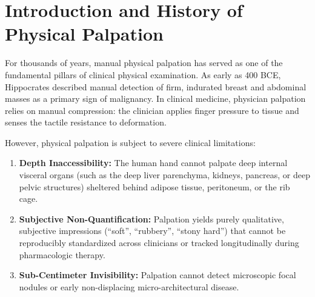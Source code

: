 \documentclass[11pt,a4paper]{article}
\begin{document}
\begin{abstract}
We examine continuum viscoelastic rheology models (Kelvin-Voigt, Maxwell, and fractional power-law dispersion), shear wave dispersion (SWD) imaging, and cerebral MRE for neurodegenerative diseases and brain tumor consistency. Finally, we elucidate high-impact clinical applications: non-invasive chronic liver disease staging across METAVIR fibrosis categories (F0 to F4 cirrhosis), Baveno VII criteria for clinically significant portal hypertension (CSPH) and esophageal varices screening, spleen stiffness measurement (SSM), characterization of breast carcinoma via the ``stiff rim sign'', thyroid nodule risk stratification, renal allograft fibrosis, musculoskeletal tendinopathy, and cardiac diastolic myocardial stiffness. We rigorously formulate quality assurance metrics, patient preparation rules (fasting state, respiratory suspension), and confounding artifacts (acute inflammation, cholestasis, cardiac congestion, and ascites).
\end{abstract}

\tableofcontents
\newpage

\section{Introduction and History of Physical Palpation}
For thousands of years, manual physical palpation has served as one of the fundamental pillars of clinical physical examination. As early as 400 BCE, Hippocrates described manual detection of firm, indurated breast and abdominal masses as a primary sign of malignancy. In clinical medicine, physician palpation relies on manual compression: the clinician applies finger pressure to tissue and senses the tactile resistance to deformation.

However, physical palpation is subject to severe clinical limitations:
\begin{enumerate}[leftmargin=2em]
    \item \textbf{Depth Inaccessibility:} The human hand cannot palpate deep internal visceral organs (such as the deep liver parenchyma, kidneys, pancreas, or deep pelvic structures) sheltered behind adipose tissue, peritoneum, or the rib cage.
    \item \textbf{Subjective Non-Quantification:} Palpation yields purely qualitative, subjective impressions (``soft'', ``rubbery'', ``stony hard'') that cannot be reproducibly standardized across clinicians or tracked longitudinally during pharmacologic therapy.
    \item \textbf{Sub-Centimeter Invisibility:} Palpation cannot detect microscopic focal nodules or early non-displacing micro-architectural disease.
\end{enumerate}
\end{document}
